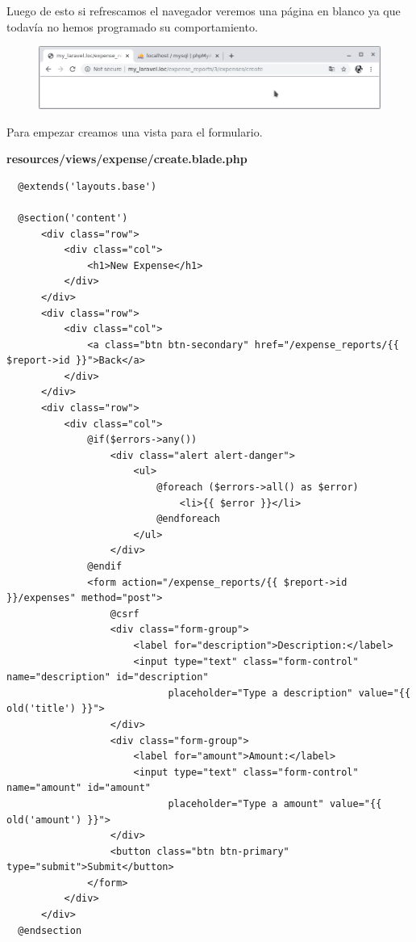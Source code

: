 \documentclass{article}
\begin{document}
Luego de esto si refrescamos el navegador veremos una página en blanco ya que
todavía no hemos programado su comportamiento.

\begin{figure}[h!]
  \centering
  \includegraphics[scale=0.5]{./Pictures/114_blank_page.png}
\end{figure}

Para empezar creamos una vista para el formulario.\\

\newpage

\textbf{resources/views/expense/create.blade.php}
\begin{verbatim}
  @extends('layouts.base')

  @section('content')
      <div class="row">
          <div class="col">
              <h1>New Expense</h1>
          </div>
      </div>
      <div class="row">
          <div class="col">
              <a class="btn btn-secondary" href="/expense_reports/{{ $report->id }}">Back</a>
          </div>
      </div>
      <div class="row">
          <div class="col">
              @if($errors->any())
                  <div class="alert alert-danger">
                      <ul>
                          @foreach ($errors->all() as $error)
                              <li>{{ $error }}</li>
                          @endforeach
                      </ul>
                  </div>
              @endif
              <form action="/expense_reports/{{ $report->id }}/expenses" method="post">
                  @csrf
                  <div class="form-group">
                      <label for="description">Description:</label>
                      <input type="text" class="form-control" name="description" id="description"
                            placeholder="Type a description" value="{{ old('title') }}">
                  </div>
                  <div class="form-group">
                      <label for="amount">Amount:</label>
                      <input type="text" class="form-control" name="amount" id="amount"
                            placeholder="Type a amount" value="{{ old('amount') }}">
                  </div>
                  <button class="btn btn-primary" type="submit">Submit</button>
              </form>
          </div>
      </div>
  @endsection
\end{verbatim}
\end{document}
